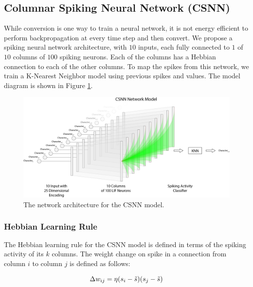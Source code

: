 \documentclass{article}
\begin{document}

\subsection*{Columnar Spiking Neural Network (CSNN)}

While conversion is one way to train a neural network, it is not energy efficient to perform backpropagation at every time step and then convert. We propose a spiking neural network architecture, with $10$ inputs, each fully connected to $1$ of $10$ columns of $100$ spiking neurons. Each of the columns has a Hebbian connection to each of the other columns. To map the spikes from this network, we train a  K-Nearest Neighbor model using previous spikes and values. \cite{beliaev2007time} The model diagram is shown in Figure \ref{fig:csnn-network-diagram}.

\begin{figure}[!h]
    \centering
    \includegraphics[width=\linewidth]{../diagrams/csnn.png}
    \caption{The network architecture for the CSNN model.}
    \label{fig:csnn-network-diagram}
\end{figure}

\subsubsection*{Hebbian Learning Rule}
The Hebbian learning rule for the CSNN model is defined in terms of the spiking activity of its $k$ columns. The weight change on spike in a connection from column $i$ to column $j$ is defined as follows:

\begin{equation}
    \Delta w_{ij} = \eta(s_{i} - \Tilde{s})(s_{j} -  \Tilde{s})
\end{equation}
\end{document}
